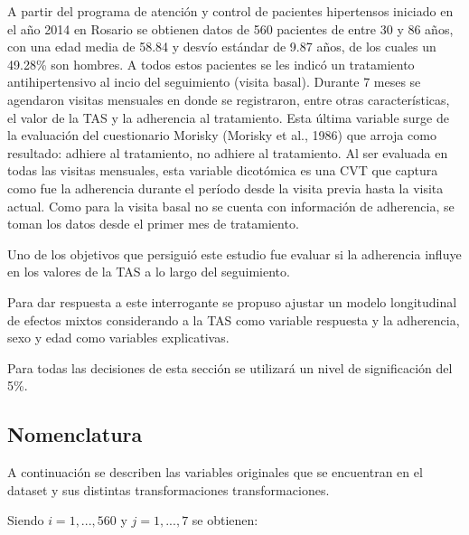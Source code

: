 \documentclass[spanish]{article}
\numberwithin{figure}{subsection}
\numberwithin{equation}{subsection}
\numberwithin{table}{subsection}
\def\npatients{560}
\begin{document}
A partir del programa de atención y control de pacientes hipertensos iniciado en
el año 2014 en Rosario se obtienen datos de \npatients{} pacientes de entre 30 y
86 años, con una edad media de 58.84 y desvío estándar de 9.87 años, de los
cuales un 49.28\% son hombres. A todos estos pacientes se les indicó un
tratamiento antihipertensivo al incio del seguimiento (visita basal). Durante 7
meses se agendaron visitas mensuales en donde se registraron, entre otras
características, el valor de la TAS y la adherencia al tratamiento. Esta última
variable surge de la evaluación del cuestionario Morisky (Morisky et al., 1986)
que arroja como resultado: adhiere al tratamiento, no adhiere al tratamiento. Al
ser evaluada en todas las visitas mensuales, esta variable dicotómica es una CVT
que captura como fue la adherencia durante el período desde la visita previa
hasta la visita actual. Como para la visita basal no se cuenta con información
de adherencia, se toman los datos desde el primer mes de tratamiento.

Uno de los objetivos que persiguió este estudio fue evaluar si la adherencia
influye en los valores de la TAS a lo largo del seguimiento.

Para dar respuesta a este interrogante se propuso ajustar un modelo longitudinal
de efectos mixtos considerando a la TAS como variable respuesta y la adherencia,
sexo y edad como variables explicativas.

Para todas las decisiones de esta sección se utilizará un nivel de significación
del 5\%.

\subsection{Nomenclatura}
\label{variables}

A continuación se describen las variables originales que se encuentran en el
dataset y sus distintas transformaciones transformaciones.

Siendo $ i = 1, ..., \npatients{}$ y $j = 1, ..., 7$ se obtienen:
\end{document}
